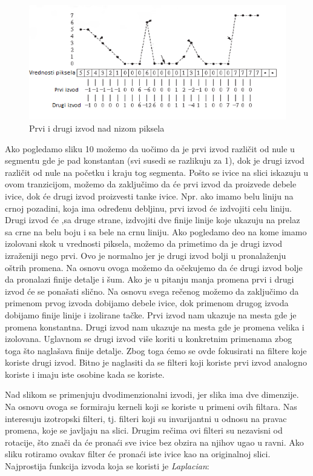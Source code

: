 \documentclass[a4paper,12pt,titlepage]{article}
\begin{document}
\begin{figure}[ht!]
\centering
\includegraphics[width=120mm]{img/izvod.png}
\caption{Prvi i drugi izvod nad nizom piksela}
\label{overflow}
\end{figure}

Ako pogledamo sliku 10 možemo da uočimo da je prvi izvod različit od nule u segmentu gde je pad konstantan (svi susedi se razlikuju za 1), dok je drugi izvod različit od nule na početku i kraju tog segmenta. Pošto se ivice na slici iskazuju u ovom tranzicijom, možemo da zaključimo da će prvi izvod da proizvede debele ivice, dok će drugi izvod proizvesti tanke ivice. Npr. ako imamo belu liniju na crnoj pozadini, koja ima određenu debljinu, prvi izvod će izdvojiti celu liniju. Drugi izvod će ,sa druge strane, izdvojiti dve finije linije koje ukazuju na prelaz sa crne na belu boju i sa bele na crnu liniju. Ako pogledamo deo na kome imamo izolovani skok u vrednosti piksela, možemo da primetimo da je drugi izvod izraženiji nego prvi. Ovo je normalno jer je drugi izvod bolji u pronalaženju oštrih promena. Na osnovu ovoga možemo da očekujemo da će drugi izvod bolje da pronalazi finije detalje i šum. Ako je u pitanju manja promena prvi i drugi izvod će se ponašati slično. Na osnovu svega rečenog možemo da zaključimo da primenom prvog izvoda dobijamo debele ivice, dok primenom drugog izvoda dobijamo finije linije i izolirane tačke. Prvi izvod nam ukazuje na mesta gde je promena konstantna. Drugi izvod nam ukazuje na mesta gde je promena velika i izolovana. Uglavnom se drugi izvod više koriti u konkretnim primenama zbog toga što naglašava finije detalje. Zbog toga ćemo se ovde fokusirati na filtere koje koriste drugi izvod. Bitno je naglasiti da se filteri koji koriste prvi izvod analogno koriste i imaju iste osobine kada se koriste.

Nad slikom se primenjuju dvodimenzionalni izvodi, jer slika ima dve dimenzije. Na osnovu ovoga se formiraju kerneli koji se koriste u primeni ovih filtara. Nas interesuju izotropski filteri, tj. filteri koji su invarijantni u odnosu na pravac promena, koje se javljaju na slici. Drugim rečima ovi filteri su nezavisni od rotacije, što znači da će pronaći sve ivice bez obzira na njihov ugao u ravni. Ako sliku rotiramo ovakav filter će pronaći iste ivice kao na originalnoj slici. Najprostija funkcija izvoda koja se koristi je \emph{Laplacian}:
\end{document}
